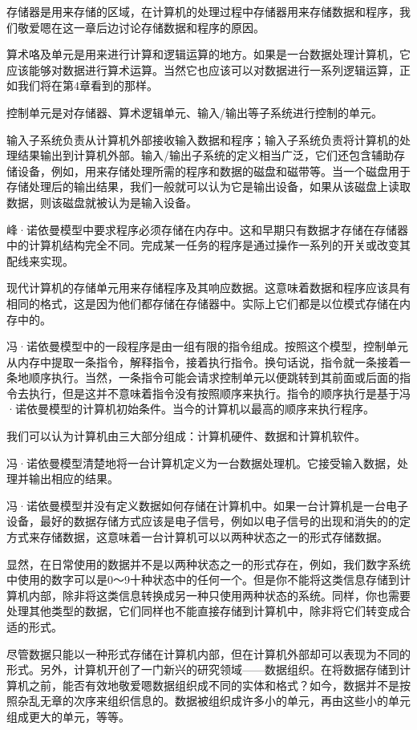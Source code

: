 存储器是用来存储的区域，在计算机的处理过程中存储器用来存储数据和程序，我们敬爱嗯在这一章后边讨论存储数据和程序的原因。

算术咯及单元是用来进行计算和逻辑运算的地方。如果是一台数据处理计算机，它应该能够对数据进行算术运算。当然它也应该可以对数据进行一系列逻辑运算，正如我们将在第4章看到的那样。

控制单元是对存储器、算术逻辑单元、输入/输出等子系统进行控制的单元。

输入子系统负责从计算机外部接收输入数据和程序；输入子系统负责将计算机的处理结果输出到计算机外部。输入/输出子系统的定义相当广泛，它们还包含辅助存储设备，例如，用来存储处理所需的程序和数据的磁盘和磁带等。当一个磁盘用于存储处理后的输出结果，我们一般就可以认为它是输出设备，如果从该磁盘上读取数据，则该磁盘就被认为是输入设备。

峰·诺依曼模型中要求程序必须存储在内存中。这和早期只有数据才存储在存储器中的计算机结构完全不同。完成某一任务的程序是通过操作一系列的开关或改变其配线来实现。

现代计算机的存储单元用来存储程序及其响应数据。这意味着数据和程序应该具有相同的格式，这是因为他们都存储在存储器中。实际上它们都是以位模式存储在内存中的。

冯·诺依曼模型中的一段程序是由一组有限的指令组成。按照这个模型，控制单元从内存中提取一条指令，解释指令，接着执行指令。换句话说，指令就一条接着一条地顺序执行。当然，一条指令可能会请求控制单元以便跳转到其前面或后面的指令去执行，但是这并不意味着指令没有按照顺序来执行。指令的顺序执行是基于冯·诺依曼模型的计算机初始条件。当今的计算机以最高的顺序来执行程序。

我们可以认为计算机由三大部分组成：计算机硬件、数据和计算机软件。

冯·诺依曼模型清楚地将一台计算机定义为一台数据处理机。它接受输入数据，处理并输出相应的结果。

冯·诺依曼模型并没有定义数据如何存储在计算机中。如果一台计算机是一台电子设备，最好的数据存储方式应该是电子信号，例如以电子信号的出现和消失的的定方式来存储数据，这意味着一台计算机可以以两种状态之一的形式存储数据。

显然，在日常使用的数据并不是以两种状态之一的形式存在，例如，我们数字系统中使用的数字可以是0～9十种状态中的任何一个。但是你不能将这类信息存储到计算机内部，除非将这类信息转换成另一种只使用两种状态的系统。同样，你也需要处理其他类型的数据，它们同样也不能直接存储到计算机中，除非将它们转变成合适的形式。

尽管数据只能以一种形式存储在计算机内部，但在计算机外部却可以表现为不同的形式。另外，计算机开创了一门新兴的研究领域——数据组织。在将数据存储到计算机之前，能否有效地敬爱嗯数据组织成不同的实体和格式？如今，数据并不是按照杂乱无章的次序来组织信息的。数据被组织成许多小的单元，再由这些小的单元组成更大的单元，等等。

